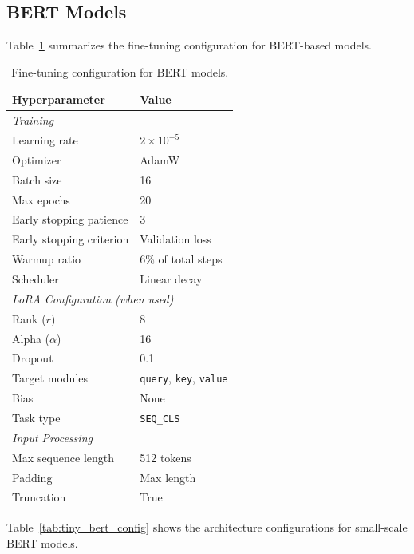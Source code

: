 \subsection{BERT Models}
\label{appendix:bert}

Table~\ref{tab:bert_config} summarizes the fine-tuning configuration for BERT-based models.

\begin{table}[h]
\centering
\caption{Fine-tuning configuration for BERT models.}
\label{tab:bert_config}
\begin{tabular}{ll}
\toprule
Hyperparameter & Value \\
\midrule
\multicolumn{2}{l}{\textit{Training}} \\
Learning rate & $2 \times 10^{-5}$ \\
Optimizer & AdamW \\
Batch size & 16 \\
Max epochs & 20 \\
Early stopping patience & 3 \\
Early stopping criterion & Validation loss \\
Warmup ratio & 6\% of total steps \\
Scheduler & Linear decay \\
\midrule
\multicolumn{2}{l}{\textit{LoRA Configuration (when used)}} \\
Rank ($r$) & 8 \\
Alpha ($\alpha$) & 16 \\
Dropout & 0.1 \\
Target modules & \texttt{query}, \texttt{key}, \texttt{value} \\
Bias & None \\
Task type & \texttt{SEQ\_CLS} \\
\midrule
\multicolumn{2}{l}{\textit{Input Processing}} \\
Max sequence length & 512 tokens \\
Padding & Max length \\
Truncation & True \\
\bottomrule
\end{tabular}
\end{table}

Table~\ref{tab:tiny_bert_config} shows the architecture configurations for small-scale BERT models.

